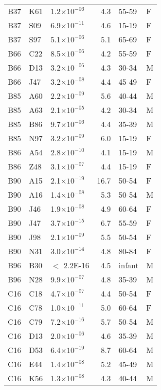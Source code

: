 \begin{longtable}{lllrll}
   B37 & K61 & 1.2$\times10^{-06}$ & 4.3 & 55-59 & F \\ 
   B37 & S09 & 6.9$\times10^{-11}$ & 4.6 & 15-19 & F \\ 
   B37 & S97 & 5.1$\times10^{-06}$ & 5.1 & 65-69 & F \\ 
   B66 & C22 & 8.5$\times10^{-06}$ & 4.2 & 55-59 & F \\ 
   B66 & D13 & 3.2$\times10^{-06}$ & 4.3 & 30-34 & M \\ 
   B66 & J47 & 3.2$\times10^{-08}$ & 4.4 & 45-49 & F \\ 
   B85 & A60 & 2.2$\times10^{-09}$ & 5.6 & 40-44 & M \\ 
   B85 & A63 & 2.1$\times10^{-05}$ & 4.2 & 30-34 & M \\ 
   B85 & B86 & 9.7$\times10^{-06}$ & 4.4 & 35-39 & M \\ 
   B85 & N97 & 3.2$\times10^{-09}$ & 6.0 & 15-19 & F \\ 
   B86 & A54 & 2.8$\times10^{-10}$ & 4.1 & 15-19 & M \\ 
   B86 & Z48 & 3.1$\times10^{-07}$ & 4.4 & 15-19 & F \\ 
   B90 & A15 & 2.1$\times10^{-19}$ & 16.7 & 50-54 & F \\ 
   B90 & A16 & 1.4$\times10^{-08}$ & 5.3 & 50-54 & M \\ 
   B90 & J46 & 1.9$\times10^{-08}$ & 4.9 & 60-64 & F \\ 
   B90 & J47 & 3.7$\times10^{-15}$ & 6.7 & 55-59 & F \\ 
   B90 & J98 & 2.1$\times10^{-09}$ & 5.5 & 50-54 & F \\ 
   B90 & N31 & 3.0$\times10^{-14}$ & 4.8 & 80-84 & F \\ 
   B96 & B30 & $<$ 2.2E-16 & 4.5 & infant & M \\ 
   B96 & N28 & 9.9$\times10^{-07}$ & 4.8 & 35-39 & M \\ 
   C16 & C18 & 4.7$\times10^{-07}$ & 4.4 & 50-54 & F \\ 
   C16 & C78 & 1.0$\times10^{-11}$ & 5.0 & 60-64 & F \\ 
   C16 & C79 & 7.2$\times10^{-16}$ & 5.7 & 50-54 & M \\ 
   C16 & D13 & 2.0$\times10^{-06}$ & 4.6 & 35-39 & M \\ 
   C16 & D53 & 6.4$\times10^{-19}$ & 8.7 & 60-64 & M \\ 
   C16 & E44 & 1.4$\times10^{-08}$ & 5.2 & 45-49 & M \\ 
   C16 & K56 & 1.3$\times10^{-08}$ & 4.3 & 40-44 & M \\ 

\end{longtable}
